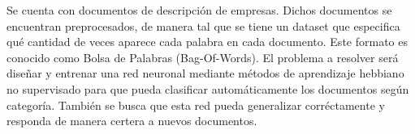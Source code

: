 \par Se cuenta con documentos de descripción de empresas. Dichos documentos se encuentran preprocesados, de manera tal que se tiene un dataset que especifica qué cantidad de veces aparece cada palabra en cada documento. Este formato es conocido como Bolsa de Palabras (Bag-Of-Words). El problema a resolver será diseñar y entrenar una red neuronal mediante métodos de aprendizaje hebbiano no supervisado para que pueda clasificar automáticamente los documentos según categoría. También se busca que esta red pueda generalizar corréctamente y responda de manera certera a nuevos documentos.